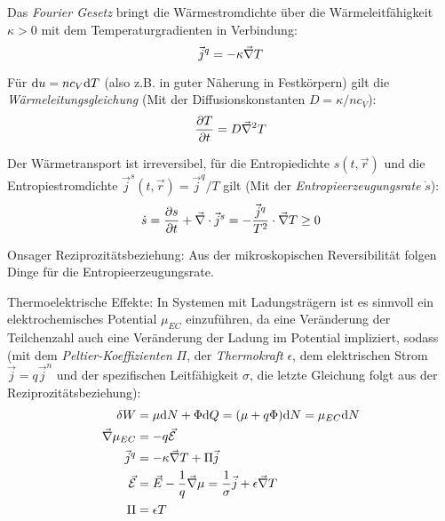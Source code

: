 \documentclass[11pt]{article}
\numberwithin{equation}{section}
\begin{document}
				\noindent
				Das \emph{Fourier Gesetz} bringt die Wärmestromdichte über die Wärmeleitfähigkeit $\kappa >0$ mit dem Temperaturgradienten in Verbindung:
				\begin{equation}
					\vec{j}^q = -\kappa \vec{\nabla} T
				\end{equation}

				\noindent
				Für $\mathrm{d} u = nc_V \mathrm{d} T$ (also z.B. in guter Näherung in Festkörpern) gilt die \emph{Wärmeleitungsgleichung} (Mit der Diffusionskonstanten $D=\kappa/nc_V$):
				\begin{equation}
					\frac{\partial T}{\partial t} = D\vec{\nabla}^2 T
				\end{equation}

				\noindent
				Der Wärmetransport ist irreversibel, für die Entropiedichte $s(t,\vec{r})$ und die Entropiestromdichte \linebreak $\vec{j}^s (t,\vec{r}) = \vec{j}^q/T$ gilt (Mit der \emph{Entropieerzeugungsrate} $\dot{s}$):
				\begin{equation}
					\dot{s} = \frac{\partial s}{\partial t} + \vec{\nabla}\cdot\vec{j}^s = - \frac{\vec{j}^q}{T^2}\cdot\vec{\nabla} T \ge 0
				\end{equation}

				\noindent
				Onsager Reziprozitätsbeziehung: Aus der mikroskopischen Reversibilität folgen Dinge für die Entropieerzeugungsrate.\vsp

				\noindent
				Thermoelektrische Effekte: In Systemen mit Ladungsträgern ist es sinnvoll ein elektrochemisches Potential $\mu_{EC}$ einzuführen, da eine Veränderung der Teilchenzahl auch eine Veränderung der Ladung im Potential impliziert, sodass (mit dem \emph{Peltier-Koeffizienten} $\Pi$, der \emph{Thermokraft} $\epsilon$, dem elektrischen Strom $\vec{j} = q\vec{j}^n$ und der spezifischen Leitfähigkeit $\sigma$, die letzte Gleichung folgt aus der Reziprozitätsbeziehung):
				\begin{equation}
					\begin{aligned}
						\delta W &= \mu \mathrm{d} N + \Phi \mathrm{d} Q = (\mu+q\Phi)\mathrm{d} N = \mu_{EC} \mathrm{d} N \\
						\vec{\nabla} \mu_{EC} &= -q\vec{\mathcal{E}} \\
						\vec{j}^q &= - \kappa \vec{\nabla} T + \Pi \vec{j} \\
						\vec{\mathcal{E}} &= \vec{E} - \frac{1}{q} \vec{\nabla} \mu = \frac{1}{\sigma} \vec{j} + \epsilon \vec{\nabla} T \\
						\Pi &= \epsilon T \\
					\end{aligned}
				\end{equation}
\end{document}
